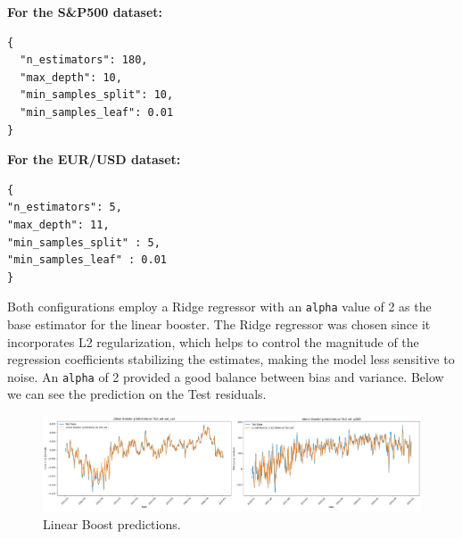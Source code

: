 \textbf{For the S\&P500 dataset:}\begin{verbatim}
{
  "n_estimators": 180,  
  "max_depth": 10,  
  "min_samples_split": 10,  
  "min_samples_leaf": 0.01
}
\end{verbatim}
\textbf{For the EUR/USD dataset:}\begin{verbatim}
{
"n_estimators": 5,  
"max_depth": 11,  
"min_samples_split" : 5, 
"min_samples_leaf" : 0.01
}
\end{verbatim}
Both configurations employ a Ridge regressor with an \texttt{alpha} value of 2 as the base estimator for the linear booster. The Ridge regressor was chosen since it incorporates L2 regularization, which helps to control the magnitude of the regression coefficients stabilizing the estimates, making the model less sensitive to noise. An \texttt{alpha} of 2 provided a good balance between bias and variance.
Below we can see the prediction on the Test residuals.
 \begin{figure}[H]
    \centering
    \includegraphics[width=1\textwidth]{Machine_learning_thesis/Images/Linear Boost predictions.png}
    \caption{Linear Boost predictions.} 
    \label{fig:Linear Boost predictions}
\end{figure}

